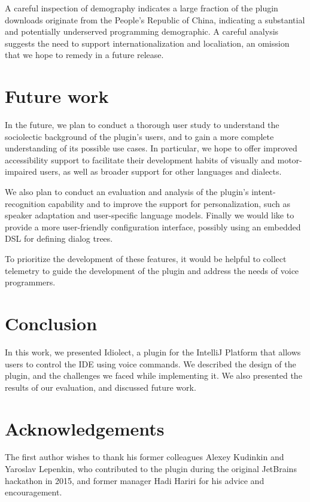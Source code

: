 \documentclass[conference]{IEEEtran}
\begin{document}
A careful inspection of demography indicates a large fraction of the plugin downloads originate from the People's Republic of China, indicating a substantial and potentially underserved programming demographic. A careful analysis suggests the need to support internationalization and localiation, an omission that we hope to remedy in a future release.

\section{Future work}

In the future, we plan to conduct a thorough user study to understand the sociolectic background of the plugin's users, and to gain a more complete understanding of its possible use cases. In particular, we hope to offer improved accessibility support to facilitate their development habits of visually and motor-impaired users, as well as broader support for other languages and dialects.

We also plan to conduct an evaluation and analysis of the plugin's intent-recognition capability and to improve the support for personalization, such as speaker adaptation and user-specific language models. Finally we would like to provide a more user-friendly configuration interface, possibly using an embedded DSL for defining dialog trees.

To prioritize the development of these features, it would be helpful to collect telemetry to guide the development of the plugin and address the needs of voice programmers.

\section{Conclusion}

In this work, we presented Idiolect, a plugin for the IntelliJ Platform that allows users to control the IDE using voice commands. We described the design of the plugin, and the challenges we faced while implementing it. We also presented the results of our evaluation, and discussed future work.

\section{Acknowledgements}

The first author wishes to thank his former colleagues Alexey Kudinkin and Yaroslav Lepenkin, who contributed to the plugin during the original JetBrains hackathon in 2015, and former manager Hadi Hariri for his advice and encouragement.
\end{document}

